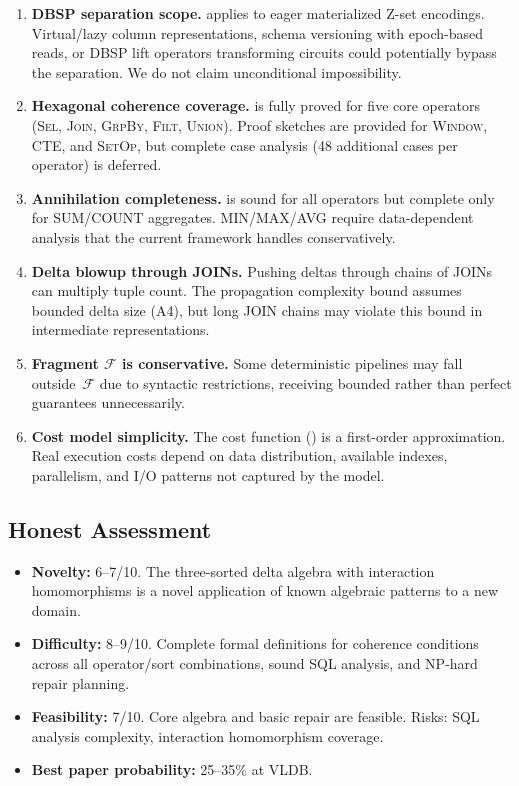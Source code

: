 \documentclass[11pt,a4paper]{article}
\theoremstyle{definition}
\newcommand{\FragF}{\mathcal{F}}
\begin{document}
\begin{enumerate}
  \item \textbf{DBSP separation scope.}
     applies to eager materialized Z-set encodings.
    Virtual/lazy column representations, schema versioning with epoch-based
    reads, or DBSP lift operators transforming circuits could potentially
    bypass the separation.  We do not claim unconditional impossibility.

  \item \textbf{Hexagonal coherence coverage.}
     is fully proved for five core operators
    (\textsc{Sel}, \textsc{Join}, \textsc{GrpBy}, \textsc{Filt}, \textsc{Union}).
    Proof sketches are provided for \textsc{Window}, \textsc{CTE}, and
    \textsc{SetOp}, but complete case analysis (48 additional cases per
    operator) is deferred.

  \item \textbf{Annihilation completeness.}
     is sound for all operators but complete only
    for SUM/COUNT aggregates.  MIN/MAX/AVG require data-dependent analysis
    that the current framework handles conservatively.

  \item \textbf{Delta blowup through JOINs.}
    Pushing deltas through chains of JOINs can multiply tuple count.
    The propagation complexity bound assumes bounded delta size (A4), but
    long JOIN chains may violate this bound in intermediate representations.

  \item \textbf{Fragment $\FragF$ is conservative.}
    Some deterministic pipelines may fall outside~$\FragF$ due to syntactic
    restrictions, receiving bounded rather than perfect guarantees unnecessarily.

  \item \textbf{Cost model simplicity.}
    The cost function () is a first-order approximation.
    Real execution costs depend on data distribution, available indexes,
    parallelism, and I/O patterns not captured by the model.
\end{enumerate}

\subsection{Honest Assessment}

\begin{itemize}[nosep]
  \item \textbf{Novelty:} 6--7/10.  The three-sorted delta algebra with
    interaction homomorphisms is a novel application of known algebraic
    patterns to a new domain.
  \item \textbf{Difficulty:} 8--9/10.  Complete formal definitions for
    coherence conditions across all operator/sort combinations, sound SQL
    analysis, and NP-hard repair planning.
  \item \textbf{Feasibility:} 7/10.  Core algebra and basic repair are feasible.
    Risks: SQL analysis complexity, interaction homomorphism coverage.
  \item \textbf{Best paper probability:} 25--35\% at VLDB.
\end{itemize}
\end{document}
